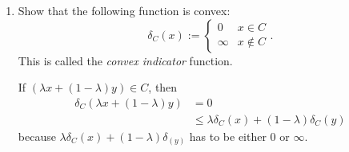 \documentclass[11pt]{amsart}
\theoremstyle{plain}
\theoremstyle{definition}
\begin{document}
\begin{enumerate}
\begin{enumerate}
\item Show that the following function is convex:
\[
\delta_C(x) := \begin{cases} 0 & x \in C \\ \infty & x \not\in C \end{cases}. 
\]
This is called the {\it convex indicator} function. 

If $(\lambda x + (1 - \lambda)y) \in C$, then
\begin{align} \nonumber
\delta_C(\lambda x + (1 - \lambda)y) &= 0 \\ \nonumber
											&\leq \lambda \delta_C(x) + (1 - \lambda)\delta_C(y)
\end{align}
because $\lambda \delta_C(x) + (1 - \lambda)\delta_(y)$ has to be either 0 or $\infty$.

\end{enumerate}

\end{enumerate}
\end{document}
